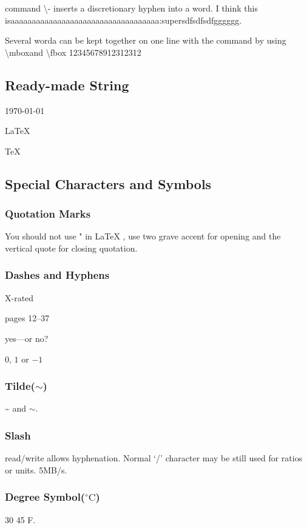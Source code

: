 \documentclass[11pt]{article}
\begin{document}
command \textbackslash - inserts a discretionary hyphen into a word. I think this isaaaaaaaaaaaaaaaaaaaaaaaaaaaaaaaaaaa:su\-persdf\-sdfsdf\-gggggg.

Several worda can be kept together on one line with the command by using \textbackslash mbox{}and \textbackslash fbox{} \mbox{12345678912312312} 

\subsection{Ready-made String}
\today

\LaTeX

\TeX

\LaTeXe

\subsection{Special Characters and Symbols}
\subsubsection{Quotation Marks}
You should not use " in \LaTeX{} , use two grave accent for opening and the vertical quote for closing quotation.
\subsubsection{Dashes and Hyphens}
X-rated

pages 12--37

yes---or no?

$0$, $1$ or $-1$
\subsubsection{Tilde($\sim$)}
\~{} and $\sim$.

\subsubsection{Slash}
read\slash write allows hyphenation. Normal `/' character may be still used for ratios or units. 5MB/s.

\subsubsection{Degree Symbol($^{\circ}\mathrm{C}$)}

30 \textcelsius{}
45 \textdegree{}F.
\texteuro%
\end{document}
